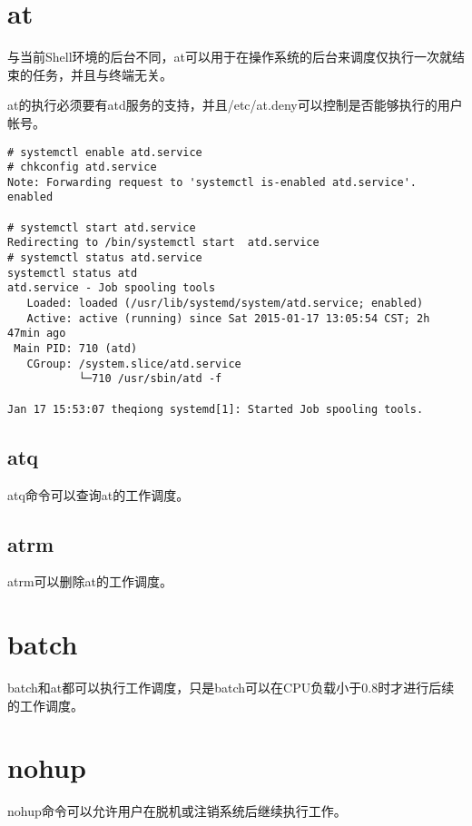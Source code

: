 \section{at} 

与当前Shell环境的后台不同，at可以用于在操作系统的后台来调度仅执行一次就结束的任务，并且与终端无关。

at的执行必须要有atd服务的支持，并且/etc/at.deny可以控制是否能够执行的用户帐号。

\begin{verbatim}
# systemctl enable atd.service
# chkconfig atd.service
Note: Forwarding request to 'systemctl is-enabled atd.service'.
enabled

# systemctl start atd.service
Redirecting to /bin/systemctl start  atd.service
# systemctl status atd.service
systemctl status atd
atd.service - Job spooling tools
   Loaded: loaded (/usr/lib/systemd/system/atd.service; enabled)
   Active: active (running) since Sat 2015-01-17 13:05:54 CST; 2h 47min ago
 Main PID: 710 (atd)
   CGroup: /system.slice/atd.service
           └─710 /usr/sbin/atd -f

Jan 17 15:53:07 theqiong systemd[1]: Started Job spooling tools.
\end{verbatim}



\subsection{atq}

atq命令可以查询at的工作调度。

\subsection{atrm}

atrm可以删除at的工作调度。



\section{batch}

batch和at都可以执行工作调度，只是batch可以在CPU负载小于0.8时才进行后续的工作调度。




\section{nohup}


nohup命令可以允许用户在脱机或注销系统后继续执行工作。


